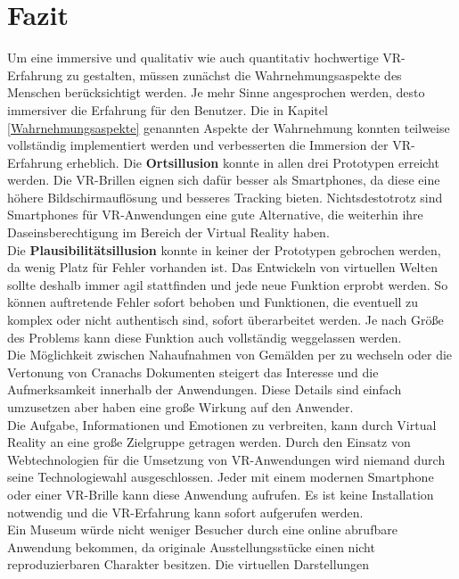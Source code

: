 \documentclass[a4paper,12pt,oneside]{article}
\begin{document}
  \section{Fazit}
    Um eine immersive und qualitativ wie auch quantitativ hochwertige 
    VR-Erfahrung zu gestalten, müssen zunächst die Wahrnehmungsaspekte
    des Menschen berücksichtigt werden. Je mehr Sinne angesprochen werden,
    desto immersiver die Erfahrung für den Benutzer. 
    Die in Kapitel \ref{Wahrnehmungsaspekte} genannten Aspekte der Wahrnehmung
    konnten teilweise vollständig implementiert werden und verbesserten
    die Immersion der VR-Erfahrung erheblich.
    Die \textbf{Ortsillusion} konnte in allen drei Prototypen erreicht werden. Die
    VR-Brillen eignen sich dafür besser als Smartphones, da diese eine höhere
    Bildschirmauflösung und besseres Tracking bieten. Nichtsdestotrotz
    sind Smartphones für VR-Anwendungen eine gute Alternative, die
    weiterhin ihre Daseinsberechtigung im Bereich der Virtual Reality
    haben. \\
    Die \textbf{Plausibilitätsillusion} konnte in keiner der 
    Prototypen gebrochen werden, da wenig Platz für Fehler 
    vorhanden ist. Das Entwickeln von virtuellen Welten sollte
    deshalb immer agil stattfinden und jede neue Funktion erprobt 
    werden. So können auftretende Fehler sofort behoben
    und Funktionen, die eventuell zu komplex oder nicht authentisch
    sind, sofort überarbeitet werden. Je nach Größe des Problems
    kann diese Funktion auch vollständig weggelassen werden. \\
    Die Möglichkeit zwischen Nahaufnahmen von Gemälden per 
    zu wechseln oder die Vertonung von Cranachs Dokumenten
    steigert das Interesse und die Aufmerksamkeit innerhalb
    der Anwendungen. Diese Details sind einfach umzusetzen
    aber haben eine große Wirkung auf den Anwender. \\
    Die Aufgabe, Informationen und Emotionen zu verbreiten, kann durch
    Virtual Reality an eine große Zielgruppe getragen werden. Durch den
    Einsatz von Webtechnologien für die Umsetzung von VR-Anwendungen 
    wird niemand durch seine Technologiewahl ausgeschlossen.
    Jeder mit einem modernen Smartphone oder einer VR-Brille kann
    diese Anwendung aufrufen. Es ist keine Installation notwendig
    und die VR-Erfahrung kann sofort aufgerufen werden. \\
    Ein Museum würde nicht weniger Besucher durch eine online abrufbare
    Anwendung bekommen, da originale Ausstellungsstücke einen nicht
    reproduzierbaren Charakter besitzen. Die virtuellen Darstellungen
\end{document}

